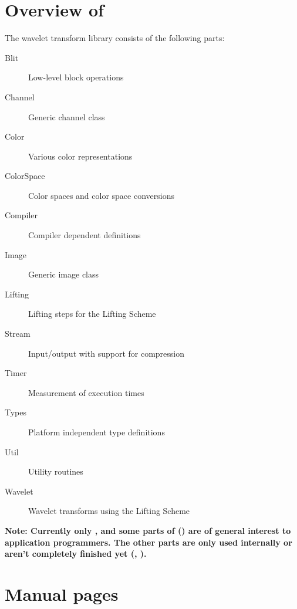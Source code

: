 %
%
% 
% 
% 
% 
%

\section{Overview of \libname}

The wavelet transform library consists of the following parts:
\begin{description}
\item[Blit] Low-level block operations
\item[Channel] Generic channel class
\item[Color] Various color representations
\item[ColorSpace] Color spaces and color space conversions
\item[Compiler] Compiler dependent definitions
\item[Image] Generic image class
\item[Lifting] Lifting steps for the Lifting Scheme
\item[Stream] Input/output with support for compression
\item[Timer] Measurement of execution times
\item[Types] Platform independent type definitions
\item[Util] Utility routines
\item[Wavelet] Wavelet transforms using the Lifting Scheme
\end{description}

\textbf{Note: Currently only ,  and some parts of
 () are of general interest to application
programmers.  The other parts are only used internally or aren't completely
finished yet (, ).}

\section{Manual pages}

